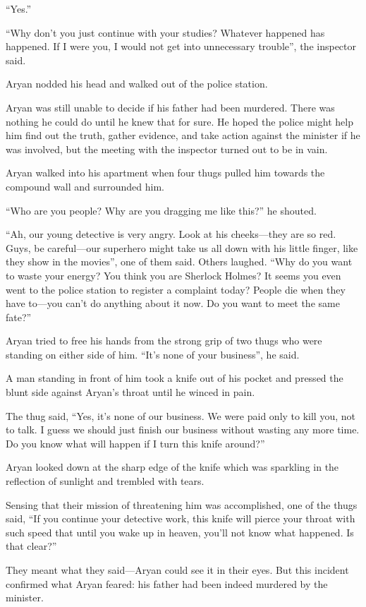 “Yes.”

“Why don't you just continue with your studies? Whatever happened has happened.
If I were you, I would not get into unnecessary trouble”, the inspector said.

Aryan nodded his head and walked out of the police station.

Aryan was still unable to decide if his father had been murdered. There was nothing
he could do until he knew that for sure. He hoped the police might help him find
out the truth, gather evidence, and take action against the minister if he was
involved, but the meeting with the inspector turned out to be in vain.

Aryan walked into his apartment when four thugs pulled him towards the compound
wall and surrounded him.

“Who are you people? Why are you dragging me like this?” he shouted.

“Ah, our young detective is very angry. Look at his cheeks—they are so red.
Guys, be careful—our superhero might take us all down with his little finger,
like they show in the movies”, one of them said. Others laughed. “Why do you
want to waste your energy? You think you are Sherlock Holmes? It seems you even
went to the police station to register a complaint today? People die when they
have to—you can't do anything about it now. Do you want to meet the same fate?”

Aryan tried to free his hands from the strong grip of two thugs who were
standing on either side of him. “It's none of your business”, he said.

A man standing in front of him took a knife out of his pocket and pressed the
blunt side against Aryan's throat until he winced in pain.

The thug said, “Yes, it's none of our business. We were paid only to kill you,
not to talk. I guess we should just finish our business without wasting any more
time. Do you know what will happen if I turn this knife around?”

Aryan looked down at the sharp edge of the knife which was sparkling in the
reflection of sunlight and trembled with tears.

Sensing that their mission of threatening him was accomplished, one of the thugs
said, “If you continue your detective work, this knife will pierce your
throat with such speed that until you wake up in heaven, you'll not know what
happened. Is that clear?”

They meant what they said—Aryan could see it in their eyes. But this incident
confirmed what Aryan feared: his father had been indeed murdered by the minister.